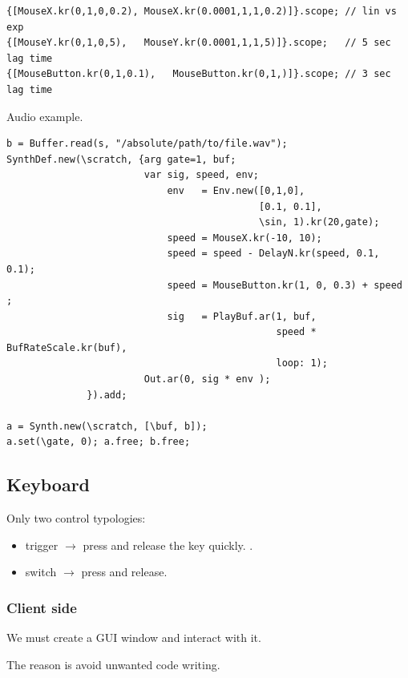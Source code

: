 \begin{lstlisting}[frame=single, caption=mouse controls Server model] 
{[MouseX.kr(0,1,0,0.2), MouseX.kr(0.0001,1,1,0.2)]}.scope; // lin vs exp
{[MouseY.kr(0,1,0,5),   MouseY.kr(0.0001,1,1,5)]}.scope;   // 5 sec lag time	
{[MouseButton.kr(0,1,0.1),   MouseButton.kr(0,1,)]}.scope; // 3 sec lag time
\end{lstlisting} 

Audio example.

\begin{lstlisting}[frame=single] 
b = Buffer.read(s, "/absolute/path/to/file.wav");
SynthDef.new(\scratch, {arg gate=1, buf;
                        var sig, speed, env;
                            env   = Env.new([0,1,0], 
                                            [0.1, 0.1], 
                                            \sin, 1).kr(20,gate);
                            speed = MouseX.kr(-10, 10);
                            speed = speed - DelayN.kr(speed, 0.1, 0.1);
                            speed = MouseButton.kr(1, 0, 0.3) + speed ;
                            sig   = PlayBuf.ar(1, buf, 
                                               speed * BufRateScale.kr(buf), 
                                               loop: 1);
                        Out.ar(0, sig * env );
              }).add;

a = Synth.new(\scratch, [\buf, b]);	
a.set(\gate, 0); a.free; b.free;
\end{lstlisting} 

\subsection{Keyboard}\label{keyboard}

Only two control typologies: 

\begin{itemize}
\tightlist
\item trigger \(\rightarrow\) press and release the key quickly. .
\item switch \(\rightarrow\) press and release.
\end{itemize}

\subsubsection{Client side}\label{key-client-side}

We must create a GUI window and interact with it.

The reason is avoid unwanted code writing.

